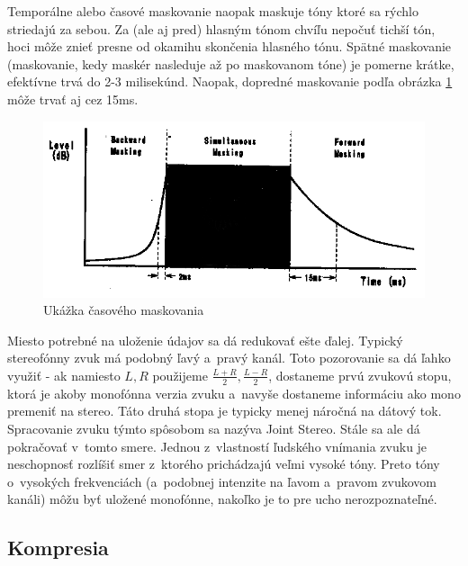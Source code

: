 Temporálne alebo časové maskovanie naopak maskuje tóny ktoré sa rýchlo
striedajú za sebou. Za (ale aj pred) hlasným tónom chvíľu nepočuť
tichší tón, hoci môže znieť presne od okamihu skončenia hlasného tónu.
Spätné maskovanie (maskovanie, kedy maskér nasleduje až po maskovanom
tóne) je pomerne krátke, efektívne trvá do 2-3 milisekúnd.
Naopak, dopredné maskovanie podľa obrázka \ref{fig:temporal_masking}
môže trvať aj cez 15ms.

\begin{figure}[htp]
    \centering
    \includegraphics{obrazky/informatika/audio/temporal_masking}
    \caption{Ukážka časového maskovania}
    \label{fig:temporal_masking}
\end{figure}

Miesto potrebné na uloženie údajov sa dá redukovať ešte ďalej.
Typický stereofónny zvuk má podobný ľavý a~pravý kanál. Toto
pozorovanie sa dá ľahko využiť - ak namiesto $L,R$ použijeme
$\frac{L+R}{2}, \frac{L-R}{2}$, dostaneme prvú zvukovú stopu, ktorá je
akoby monofónna verzia zvuku a~navyše dostaneme informáciu ako mono premeniť
na stereo. Táto druhá stopa je typicky menej náročná na dátový tok.
Spracovanie zvuku týmto spôsobom sa nazýva Joint Stereo.
Stále sa ale dá pokračovať v~tomto smere. Jednou z~vlastností ľudského
vnímania zvuku je neschopnosť rozlíšiť smer z~ktorého prichádzajú
veľmi vysoké tóny. Preto tóny o~vysokých frekvenciách (a~podobnej
intenzite na ľavom a~pravom zvukovom kanáli) môžu byť uložené
monofónne, nakoľko je to pre ucho nerozpoznateľné.

\subsection{Kompresia}


